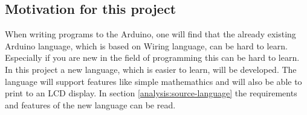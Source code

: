 \subsection{Motivation for this project}\label{introduction:motivation}
When writing programs to the Arduino, one will find that the already existing Arduino language, which is based on Wiring language, can be hard to learn. Especially if you are new in the field of programming this can be hard to learn. In this project a new language, which is easier to learn, will be developed. The language will support features like simple mathemathics and will also be able to print to an LCD display. In section \ref{analysis:source-language} the requirements and features of the new language can be read.

